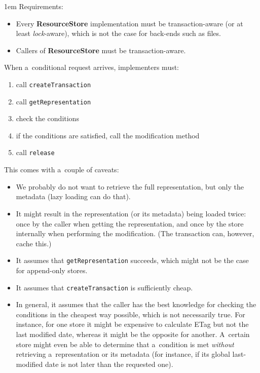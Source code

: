 \documentclass[10pt]{article}
\newenvironment{Note}
  {\begin{multicols}{3}%
     \parskip 1em}
  {\end{multicols}}
\begin{document}
\begin{Note}
Requirements:
\begin{itemize}
  \item Every \textbf{ResourceStore} implementation must be transaction-aware
        (or at least \emph{lock}-aware),
        which is not the case for back-ends such as files.
  \item Callers of \textbf{ResourceStore} must be transaction-aware.
\end{itemize}

\bigskip
When a~conditional request arrives, implementers must:
\begin{enumerate}
  \item call \verb!createTransaction!
  \item call \verb!getRepresentation!
  \item check the conditions
  \item if the conditions are satisfied, call the modification method
  \item call \verb!release!
\end{enumerate}

\bigskip
This comes with a~couple of caveats:
\begin{itemize}
  \item We probably do not want to retrieve the full representation,
        but only the metadata (lazy loading can do that).

  \item It might result in the representation (or its metadata)
        being loaded twice:
        once by the caller when getting the representation,
        and once by the store internally when performing the modification.
        (The transaction can, however, cache this.)

  \item It assumes that \verb!getRepresentation! succeeds,
        which might not be the case for append-only stores.

  \item It assumes that \verb!createTransaction! is sufficiently cheap.

  \item In general,
        it assumes that the caller has the best knowledge
        for checking the conditions in the cheapest way possible,
        which is not necessarily true.
        For instance,
        for one store it might be expensive to calculate ETag
        but not the last modified date,
        whereas it might be the opposite for another.
        A~certain store might even be able to determine
        that a~condition is met \emph{without} retrieving
        a~representation or its metadata
        (for instance, if its global last-modified date
         is not later than the requested one).
\end{itemize}

\columnbreak
\null


\columnbreak
\null

\end{Note}
\end{document}
